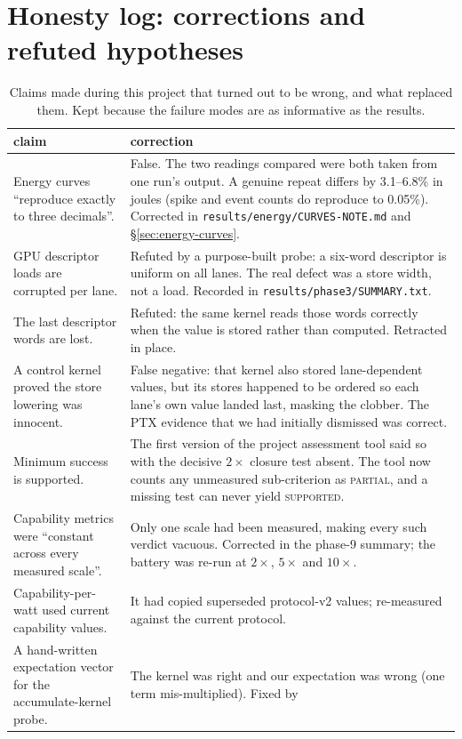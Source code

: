 \documentclass[11pt,a4paper]{article}
\newcommand{\code}[1]{\texttt{\footnotesize #1}}
\begin{document}
\section{Honesty log: corrections and refuted hypotheses}
\label{app:honesty}
\begin{table}[h]
\centering
\caption{Claims made during this project that turned out to be wrong, and what replaced them.
Kept because the failure modes are as informative as the results.}
\begin{tabular}{p{5.3cm} p{9.7cm}}
\toprule
claim & correction \\
\midrule
Energy curves ``reproduce exactly to three decimals''. &
False. The two readings compared were both taken from one run's output. A genuine repeat differs
by 3.1--6.8\% in joules (spike and event counts do reproduce to 0.05\%). Corrected in
\code{results/energy/CURVES-NOTE.md} and \S\ref{sec:energy-curves}. \\
GPU descriptor loads are corrupted per lane. &
Refuted by a purpose-built probe: a six-word descriptor is uniform on all lanes. The real defect
was a store width, not a load. Recorded in \code{results/phase3/SUMMARY.txt}. \\
The last descriptor words are lost. &
Refuted: the same kernel reads those words correctly when the value is stored rather than
computed. Retracted in place. \\
A control kernel proved the store lowering was innocent. &
False negative: that kernel also stored lane-dependent values, but its stores happened to be
ordered so each lane's own value landed last, masking the clobber. The PTX evidence that we had
initially dismissed was correct. \\
Minimum success is supported. &
The first version of the project assessment tool said so with the decisive $2\times$ closure test
absent. The tool now counts any unmeasured sub-criterion as \textsc{partial}, and a missing test
can never yield \textsc{supported}. \\
Capability metrics were ``constant across every measured scale''. &
Only one scale had been measured, making every such verdict vacuous. Corrected in the phase-9
summary; the battery was re-run at $2\times$, $5\times$ and $10\times$. \\
Capability-per-watt used current capability values. &
It had copied superseded protocol-v2 values; re-measured against the current protocol. \\
A hand-written expectation vector for the accumulate-kernel probe. &
The kernel was right and our expectation was wrong (one term mis-multiplied). Fixed by

\end{tabular}
\end{table}
\end{document}
